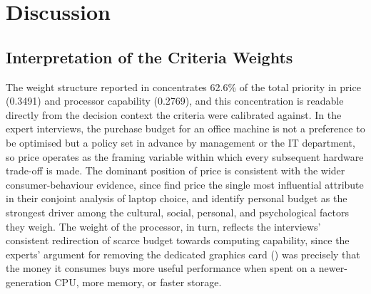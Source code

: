 \chapter{Discussion}\label{ch:discussion}


\section{Interpretation of the Criteria Weights}\label{sec:interp-weights}

The weight structure reported in  concentrates 62.6\% of the total
priority in price (0.3491) and processor capability (0.2769), and this concentration is
readable directly from the decision context the criteria were calibrated against. In the
expert interviews, the purchase budget for an office machine is not a preference to be
optimised but a policy set in advance by management or the IT department, so price operates
as the framing variable within which every subsequent hardware trade-off is made. The
dominant position of price is consistent with the wider consumer-behaviour evidence, since
\textcite{liao_determinants_2022} find price the single most influential attribute in their
conjoint analysis of laptop choice, and \textcite{sostar_assessment_2023} identify personal
budget as the strongest driver among the cultural, social, personal, and psychological
factors they weigh. The weight of the processor, in turn, reflects the interviews'
consistent redirection of scarce budget towards computing capability, since the experts'
argument for removing the dedicated graphics card () was
precisely that the money it consumes buys more useful performance when spent on a
newer-generation CPU, more memory, or faster storage.

